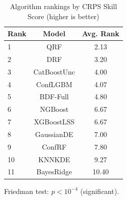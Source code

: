 \begin{table}[htbp]
\centering
\caption{Algorithm rankings by CRPS Skill Score (higher is better)}
\label{tab:rankings-crpss}
\begin{tabular}{lcc}
\toprule
Rank & Model & Avg. Rank \\
\midrule
1 & QRF & 2.13 \\
2 & DRF & 3.20 \\
3 & CatBoostUnc & 4.00 \\
4 & ConfLGBM & 4.07 \\
5 & BDF-Full & 4.80 \\
6 & NGBoost & 6.67 \\
7 & XGBoostLSS & 6.67 \\
8 & GaussianDE & 7.00 \\
9 & ConfRF & 7.80 \\
10 & KNNKDE & 9.27 \\
11 & BayesRidge & 10.40 \\
\bottomrule
\end{tabular}
\par\smallskip\footnotesize{Friedman test: $p < 10^{-4}$ (significant).}
\end{table}
